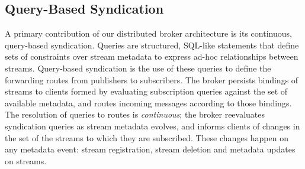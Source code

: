 %
%
\subsection{Query-Based Syndication}

A primary contribution of our distributed broker architecture is its continuous, query-based syndication.
Queries are structured, SQL-like statements that define sets of constraints over stream metadata to express ad-hoc relationships between streams.
Query-based syndication is the use of these queries to define the forwarding routes from publishers to subscribers.
The broker persists bindings of streams to clients formed by evaluating subscription queries against the set of available metadata, and routes incoming messages according to those bindings.
The resolution of queries to routes is \emph{continuous}; the broker reevaluates syndication queries as stream metadata evolves, and informs clients of changes in the set of the streams to which they are subscribed.
These changes happen on any metadata event: stream registration, stream deletion and metadata updates on streams.
